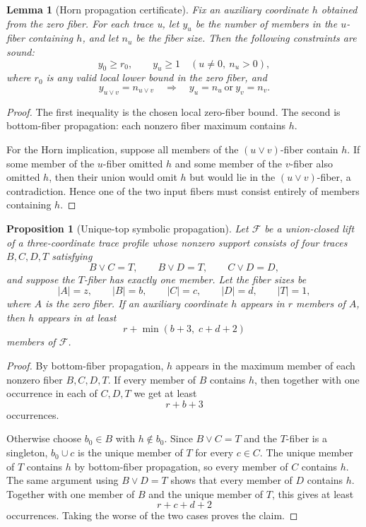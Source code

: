\documentclass[11pt]{article}
\newtheorem{lemma}{Lemma}
\newtheorem{proposition}{Proposition}
\begin{document}
\begin{lemma}[Horn propagation certificate]
Fix an auxiliary coordinate $h$ obtained from the zero fiber.  For each trace
u, let $y_u$ be the number of members in the $u$-fiber containing $h$, and
let $n_u$ be the fiber size.  Then the following constraints are sound:
\[
  y_0\geq r_0,
  \qquad
  y_u\geq1 \quad (u\neq0,\ n_u>0),
\]
where $r_0$ is any valid local lower bound in the zero fiber, and
\[
  y_{u\vee v}=n_{u\vee v}
  \quad\Longrightarrow\quad
  y_u=n_u\ \text{or}\ y_v=n_v.
\]
\end{lemma}

\begin{proof}
The first inequality is the chosen local zero-fiber bound.  The second is
bottom-fiber propagation: each nonzero fiber maximum contains $h$.

For the Horn implication, suppose all members of the $(u\vee v)$-fiber
contain $h$.  If some member of the $u$-fiber omitted $h$ and some member of
the $v$-fiber also omitted $h$, then their union would omit $h$ but would lie
in the $(u\vee v)$-fiber, a contradiction.  Hence one of the two input
fibers must consist entirely of members containing $h$.
\end{proof}

\begin{proposition}[Unique-top symbolic propagation]
Let $\mathcal{F}$ be a union-closed lift of a three-coordinate trace profile
whose nonzero support consists of four traces $B,C,D,T$ satisfying
\[
  B\vee C=T,\qquad B\vee D=T,\qquad C\vee D=D,
\]
and suppose the $T$-fiber has exactly one member.  Let the fiber sizes be
\[
  |A|=z,\qquad |B|=b,\qquad |C|=c,\qquad |D|=d,\qquad |T|=1,
\]
where $A$ is the zero fiber.  If an auxiliary coordinate $h$ appears in
$r$ members of $A$, then $h$ appears in at least
\[
  r+\min(b+3,\;c+d+2)
\]
members of $\mathcal{F}$.
\end{proposition}

\begin{proof}
By bottom-fiber propagation, $h$ appears in the maximum member of each
nonzero fiber $B,C,D,T$.  If every member of $B$ contains $h$, then together
with one occurrence in each of $C,D,T$ we get at least
\[
  r+b+3
\]
occurrences.

Otherwise choose $b_0\in B$ with $h\notin b_0$.  Since $B\vee C=T$ and the
$T$-fiber is a singleton, $b_0\cup c$ is the unique member of $T$ for every
$c\in C$.  The unique member of $T$ contains $h$ by bottom-fiber propagation,
so every member of $C$ contains $h$.  The same argument using
$B\vee D=T$ shows that every member of $D$ contains $h$.  Together with one
member of $B$ and the unique member of $T$, this gives at least
\[
  r+c+d+2
\]
occurrences.  Taking the worse of the two cases proves the claim.
\end{proof}
\end{document}
